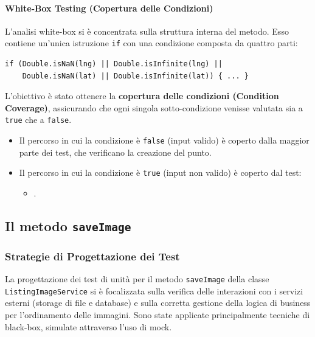 \paragraph{White-Box Testing (Copertura delle Condizioni)}
L'analisi white-box si è concentrata sulla struttura interna del metodo. Esso contiene un'unica istruzione \texttt{if} con una condizione composta da quattro parti:
\begin{verbatim}
if (Double.isNaN(lng) || Double.isInfinite(lng) ||
    Double.isNaN(lat) || Double.isInfinite(lat)) { ... }
\end{verbatim}
L'obiettivo è stato ottenere la \textbf{copertura delle condizioni (Condition Coverage)}, assicurando che ogni singola sotto-condizione venisse valutata sia a \texttt{true} che a \texttt{false}.
\begin{itemize}
    \item Il percorso in cui la condizione è \texttt{false} (input valido) è coperto dalla maggior parte dei test, che verificano la creazione del punto.
    \item Il percorso in cui la condizione è \texttt{true} (input non valido) è coperto dal test:
    \begin{itemize}
    	\item {}.
    \end{itemize}

\end{itemize}
\subsection{Il metodo \texttt{saveImage}}
\subsubsection{Strategie di Progettazione dei Test}
La progettazione dei test di unità per il metodo \texttt{saveImage} della classe \texttt{ListingImageService} si è focalizzata sulla verifica delle interazioni con i servizi esterni (storage di file e database) e sulla corretta gestione della logica di business per l'ordinamento delle immagini. Sono state applicate principalmente tecniche di black-box, simulate attraverso l'uso di mock.

